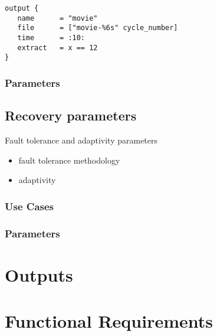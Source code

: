 \documentclass{book}
\begin{document}
\begin{verbatim}
output { 
   name      = "movie"
   file      = ["movie-%6s" cycle_number]
   time      = :10:
   extract   = x == 12
}
\end{verbatim}


\subsection{Parameters}

\section{Recovery parameters} \label{s:recovery}

Fault tolerance and adaptivity parameters

\begin{itemize}
\item fault tolerance methodology
\item adaptivity
\end{itemize}

\subsection{Use Cases}
\subsection{Parameters}

\chapter{Outputs} \label{c:outputs}

\chapter{Functional Requirements}
\end{document}
